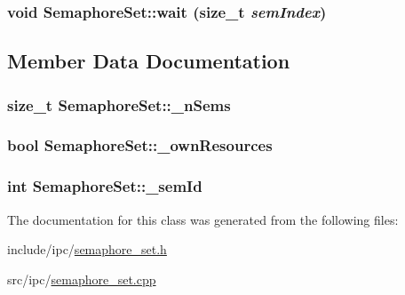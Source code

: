 \hypertarget{classSemaphoreSet_e298eb7aad5d7d0e359e6450c5dd9a0e}{
\subsubsection[{wait}]{\setlength{\rightskip}{0pt plus 5cm}void SemaphoreSet::wait (size\_\-t {\em semIndex})}}
\label{classSemaphoreSet_e298eb7aad5d7d0e359e6450c5dd9a0e}




\subsection{Member Data Documentation}
\hypertarget{classSemaphoreSet_24a0a5557ae28121a031e228e0c3219a}{
\subsubsection[{\_\-nSems}]{\setlength{\rightskip}{0pt plus 5cm}size\_\-t {\bf SemaphoreSet::\_\-nSems}}}
\label{classSemaphoreSet_24a0a5557ae28121a031e228e0c3219a}


\hypertarget{classSemaphoreSet_4756100f297c4163d7a89c27c7cd3e92}{
\subsubsection[{\_\-ownResources}]{\setlength{\rightskip}{0pt plus 5cm}bool {\bf SemaphoreSet::\_\-ownResources}}}
\label{classSemaphoreSet_4756100f297c4163d7a89c27c7cd3e92}


\hypertarget{classSemaphoreSet_8895b1fe81c6e0d0c7e25a50e80656a3}{
\subsubsection[{\_\-semId}]{\setlength{\rightskip}{0pt plus 5cm}int {\bf SemaphoreSet::\_\-semId}}}
\label{classSemaphoreSet_8895b1fe81c6e0d0c7e25a50e80656a3}




The documentation for this class was generated from the following files:\begin{CompactItemize}
\item 
include/ipc/\hyperlink{semaphore__set_8h}{semaphore\_\-set.h}\item 
src/ipc/\hyperlink{semaphore__set_8cpp}{semaphore\_\-set.cpp}\end{CompactItemize}

